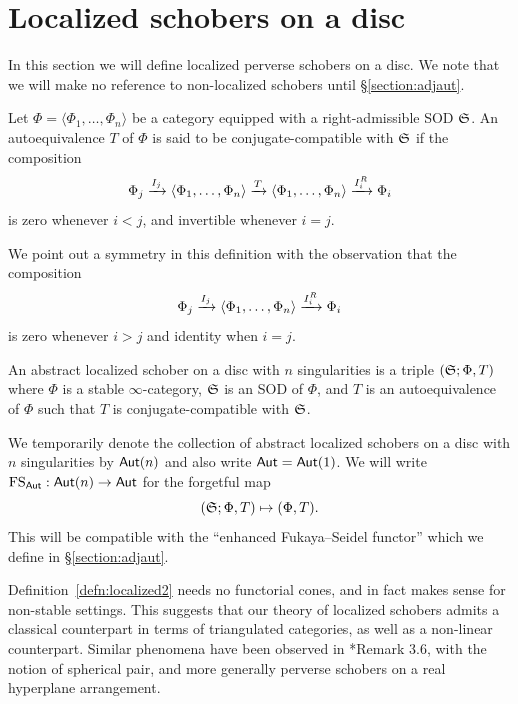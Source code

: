\section{Localized schobers on a disc}\label{section:localized}
In this section we will define localized perverse schobers on a disc. We note that we will make no reference to non-localized schobers until \S\ref{section:adjaut}.

\begin{defn}\label{defn:compatible}
    Let $\Phi=\langle\Phi_1,\dots,\Phi_n\rangle$ be a category equipped with a right-admissible SOD $\mathfrak{S}$. An autoequivalence $T$ of $\Phi$ is said to be conjugate-compatible with $\mathfrak{S}$ if the composition
    \[\Phi_j\xrightarrow{I_j}\langle\Phi_1,\dots,\Phi_n\rangle\xrightarrow{T}\langle\Phi_1,\dots,\Phi_n\rangle\xrightarrow{I_i^R}\Phi_i\]
    is zero whenever $i<j$, and invertible whenever $i=j$.
\end{defn}

We point out a symmetry in this definition with the observation that the composition
\[\Phi_j\xrightarrow{I_j}\langle\Phi_1,\dots,\Phi_n\rangle\xrightarrow{I_i^R}\Phi_i\]
is zero whenever $i>j$ and identity when $i=j$.

\begin{defn}\label{defn:localized2}
    An abstract localized schober on a disc with $n$ singularities is a triple $(\mathfrak{S};\Phi,T)$ where $\Phi$ is a stable $\infty$-category, $\mathfrak{S}$ is an SOD of $\Phi$, and $T$ is an autoequivalence of $\Phi$ such that $T$ is conjugate-compatible with $\mathfrak{S}$.
\end{defn}

We temporarily denote the collection of abstract localized schobers on a disc with $n$ singularities by $\mathsf{Aut}(n)$ and also write $\mathsf{Aut} = \mathsf{Aut}(1)$. We will write $\operatorname{FS}_{\mathsf{Aut}}:\mathsf{Aut}(n)\to\mathsf{Aut}$ for the forgetful map
\[(\mathfrak{S};\Phi,T)\mapsto (\Phi,T).\]
This will be compatible with the ``enhanced Fukaya--Seidel functor'' which we define in \S\ref{section:adjaut}.

\begin{rmk}
    Definition~\ref{defn:localized2} needs no functorial cones, and in fact makes sense for non-stable settings. This suggests that our theory of localized schobers admits a classical counterpart in terms of triangulated categories, as well as a non-linear counterpart. Similar phenomena have been observed in \cite{kapranovPerverseSchobers2015}*{Remark 3.6}, with the notion of spherical pair, and more generally perverse schobers on a real hyperplane arrangement.
\end{rmk}

